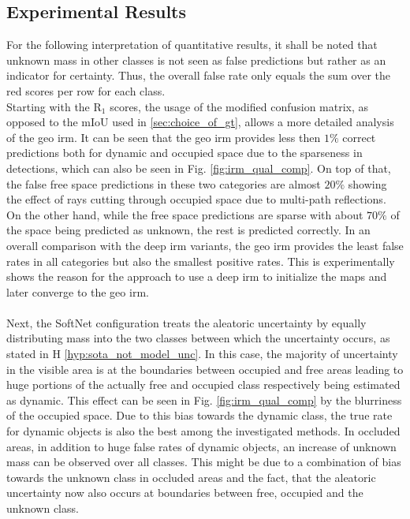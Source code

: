 \subsection{Experimental Results}
\label{subsec:exp_results_aleat_uncert}
For the following interpretation of quantitative results, it shall be noted that unknown mass in other classes is not seen as false predictions but rather as an indicator for certainty. Thus, the overall false rate only equals the sum over the red scores per row for each class.
\\ 
Starting with the R$_1$ scores, the usage of the modified confusion matrix, as opposed to the mIoU used in \ref{sec:choice_of_gt}, allows a more detailed analysis of the geo \gls{irm}. It can be seen that the geo \gls{irm} provides less then $1\%$ correct predictions both for dynamic and occupied space due to the sparseness in detections, which can also be seen in Fig. \ref{fig:irm_qual_comp}. On top of that, the false free space predictions in these two categories are almost $20\%$ showing the effect of rays cutting through occupied space due to multi-path reflections. On the other hand, while the free space predictions are sparse with about $70\%$ of the space being predicted as unknown, the rest is predicted correctly. In an overall comparison with the deep \gls{irm} variants, the geo \gls{irm} provides the least false rates in all categories but also the smallest positive rates. This is experimentally shows the reason for the approach to use a deep \gls{irm} to initialize the maps and later converge to the geo \gls{irm}.
\\\\
Next, the SoftNet configuration treats the aleatoric uncertainty by equally distributing mass into the two classes between which the uncertainty occurs, as stated in H \ref{hyp:sota_not_model_unc}. In this case, the majority of uncertainty in the visible area is at the boundaries between occupied and free areas leading to huge portions of the actually free and occupied class respectively being estimated as dynamic. This effect can be seen in Fig. \ref{fig:irm_qual_comp} by the blurriness of the occupied space. Due to this bias towards the dynamic class, the true rate for dynamic objects is also the best among the investigated methods. In occluded areas, in addition to huge false rates of dynamic objects, an increase of unknown mass can be observed over all classes. This might be due to a combination of bias towards the unknown class in occluded areas and the fact, that the aleatoric uncertainty now also occurs at boundaries between free, occupied and the unknown class. 
